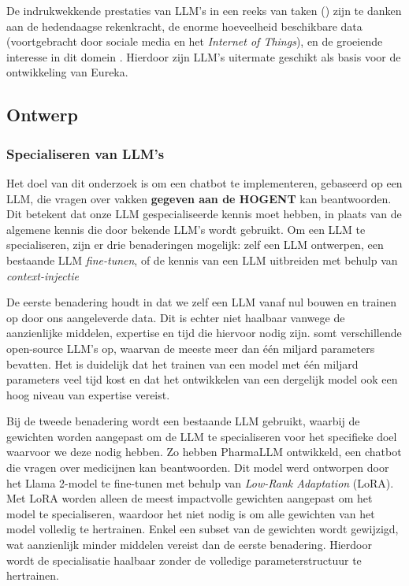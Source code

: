 De indrukwekkende prestaties van LLM's in een reeks van taken (\autocite{Naveed2023}) zijn te danken aan de hedendaagse rekenkracht, de e\-nor\-me hoeveelheid beschikbare data (voortgebracht door sociale media en het \emph{Internet of Things}), en de groeiende interesse in dit domein \autocite{Zohuri2022, Naveed2023}. Hierdoor zijn LLM's uitermate geschikt als basis voor de ontwikkeling van Eureka. 

\subsection{Ontwerp}

\subsubsection{Specialiseren van LLM's}

Het doel van dit onderzoek is om een chatbot te implementeren, gebaseerd op een LLM, die vragen over vakken \textbf{gegeven aan de HOGENT} kan beantwoorden. Dit betekent dat onze LLM gespecialiseerde kennis moet hebben, in plaats van de algemene kennis die door bekende LLM's wordt gebruikt. Om een LLM te specialiseren, zijn er drie benaderingen mogelijk: zelf een LLM ontwerpen, een bestaande LLM \emph{fine-tunen}, of de kennis van een LLM uitbreiden met behulp van \emph{context-injectie}

De eerste benadering houdt in dat we zelf een LLM vanaf nul bouwen en trainen op door ons aangeleverde data. Dit is echter niet haalbaar vanwege de aanzienlijke middelen, expertise \autocite{Naveed2023} en tijd die hiervoor nodig zijn. \textcite{Fourrier2024} somt verschillende open-source LLM's op, waarvan de meeste meer dan één miljard parameters bevatten. Het is duidelijk dat het trainen van een model met één miljard parameters veel tijd kost en dat het ontwikkelen van een dergelijk model ook een hoog niveau van expertise vereist.

Bij de tweede benadering wordt een bestaande LLM gebruikt, waarbij de gewichten worden aangepast om de LLM te specialiseren voor het specifieke doel waarvoor we deze nodig hebben. Zo hebben \textcite{Azam2024} PharmaLLM ontwikkeld, een chatbot die vragen over medicijnen kan beantwoorden. Dit model werd ontworpen door het Llama 2-model te fine-tunen met behulp van \emph{Low-Rank Adaptation} (LoRA). Met LoRA worden alleen de meest impactvolle gewichten aangepast om het model te specialiseren, waardoor het niet nodig is om alle gewichten van het model volledig te hertrainen. Enkel een subset van de gewichten wordt gewijzigd, wat aanzienlijk minder middelen vereist dan de eerste benadering. Hierdoor wordt de specialisatie haalbaar zonder de volledige parameterstructuur te hertrainen.

